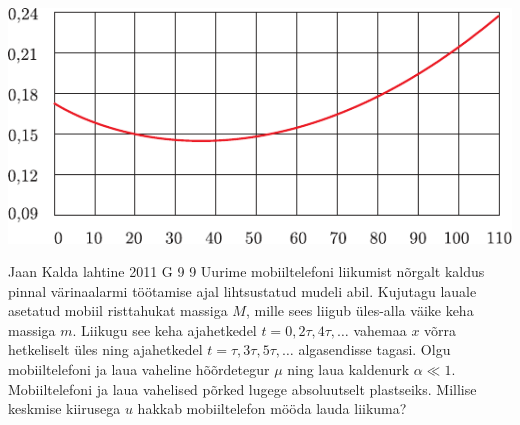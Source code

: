 \documentclass[11pt]{article}
\begin{document}
{{\begin{center}
	\includegraphics[width=\linewidth]{2006-lahg-10-yl}
\end{center}
\fi
}

{Jaan Kalda} %
{lahtine} %
{2011} %
{G 9} %
{9} %
{
\ifStatement
Uurime mobiiltelefoni liikumist nõrgalt kaldus pinnal värinaalarmi töötamise
ajal lihtsustatud mudeli abil.
Kujutagu lauale asetatud mobiil risttahukat massiga $M$, mille sees liigub
üles-alla väike keha massiga $m$.
Liikugu see keha ajahetkedel $t=0, 2\tau, 4\tau, \ldots$ vahemaa $x$ võrra
hetkeliselt üles ning ajahetkedel $t=\tau, 3\tau, 5\tau, \ldots$ algasendisse
tagasi.
Olgu mobiiltelefoni ja laua vaheline hõõrdetegur $\mu$ ning laua kaldenurk
$\alpha \ll 1$. Mobiiltelefoni ja laua vahelised põrked lugege absoluutselt
plastseiks.
Millise keskmise kiirusega $u$ hakkab mobiiltelefon mööda lauda liikuma?
\fi
}

}
\end{document}
